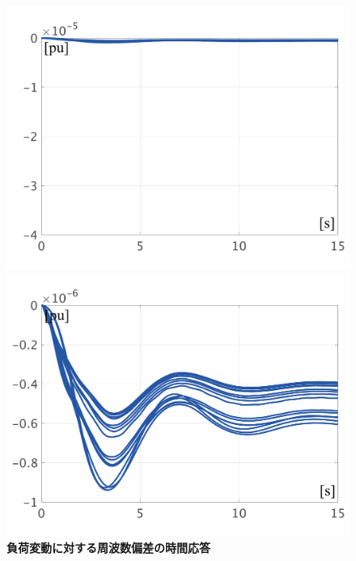 \documentclass[tombow,dvipdfmx]{corona-a5-1.1}
\begin{document}
\begin{figure}[t]
{\begin{minipage}{0.49\linewidth}
    \includegraphics[width = 1.0\linewidth]{figs/WavrWagc}
    \medskip
  \end{minipage}
  \begin{minipage}{0.49\linewidth}
    \centering
    \includegraphics[width = 1.0\linewidth]{figs/WavrWagcL}
    \medskip
  \end{minipage}
  }
  \medskip
  \caption{\textbf{負荷変動に対する周波数偏差の時間応答} }
  \label{fig:omegasAGC}
\medskip
\end{figure}
\end{document}
